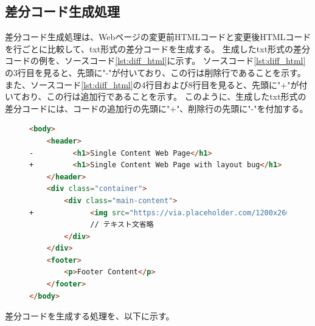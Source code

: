 \subsection{差分コード生成処理}\label{subsec:diff_file_generate}
差分コード生成処理は、Webページの変更前HTMLコードと変更後HTMLコードを行ごとに比較して、txt形式の差分コードを生成する。
生成したtxt形式の差分コードの例を、ソースコード\ref{lst:diff_html}に示す。
ソースコード\ref{lst:diff_html}の3行目を見ると、先頭に"-"が付いており、この行は削除行であることを示す。
また、ソースコード\ref{lst:diff_html}の4行目および8行目を見ると、先頭に"+"が付いており、この行は追加行であることを示す。
このように、生成したtxt形式の差分コードには、コードの追加行の先頭に"+"、削除行の先頭に"-"を付加する。
\begin{figure}[tp]
    \begin{lstlisting}[language=HTML, caption=生成したtxt形式の差分コードの例, label=lst:diff_html]
<body>
    <header>
-         <h1>Single Content Web Page</h1>
+         <h1>Single Content Web Page with layout bug</h1>
    </header>
    <div class="container">
        <div class="main-content">
+             <img src="https://via.placeholder.com/1200x260" alt="Placeholder Image">
              // テキスト文省略
        </div>
    </div>
    <footer>
        <p>Footer Content</p>
    </footer>
</body>
    \end{lstlisting}
\end{figure}
\par
差分コードを生成する処理を、以下に示す。
